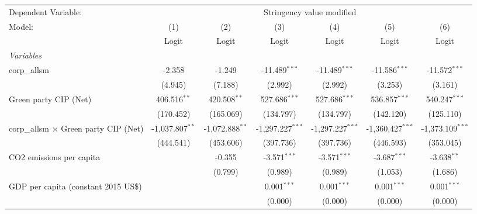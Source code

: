 
\begingroup
\centering
\begin{tabular}{lcccccc}
   \toprule
   Dependent Variable: & \multicolumn{6}{c}{Stringency value modified}\\
   Model:                                       & (1)               & (2)               & (3)                & (4)                & (5)                & (6)\\  
                                                &  Logit            & Logit             & Logit              & Logit              & Logit              & Logit\\  
   \midrule
   \emph{Variables}\\
   corp\_allsm                                  & -2.358            & -1.249            & -11.489$^{***}$    & -11.489$^{***}$    & -11.586$^{***}$    & -11.572$^{***}$\\   
                                                & (4.945)           & (7.188)           & (2.992)            & (2.992)            & (3.253)            & (3.161)\\   
   Green party CIP (Net)                        & 406.516$^{**}$    & 420.508$^{**}$    & 527.686$^{***}$    & 527.686$^{***}$    & 536.857$^{***}$    & 540.247$^{***}$\\   
                                                & (170.452)         & (165.069)         & (134.797)          & (134.797)          & (142.120)          & (125.110)\\   
   corp\_allsm $\times$ Green party CIP (Net)   & -1,037.807$^{**}$ & -1,072.888$^{**}$ & -1,297.227$^{***}$ & -1,297.227$^{***}$ & -1,360.427$^{***}$ & -1,373.109$^{***}$\\   
                                                & (444.541)         & (453.606)         & (397.736)          & (397.736)          & (446.593)          & (353.045)\\   
   CO2 emissions per capita                     &                   & -0.355            & -3.571$^{***}$     & -3.571$^{***}$     & -3.687$^{***}$     & -3.638$^{**}$\\   
                                                &                   & (0.799)           & (0.989)            & (0.989)            & (1.053)            & (1.686)\\   
   GDP per capita (constant 2015 US\$)          &                   &                   & 0.001$^{***}$      & 0.001$^{***}$      & 0.001$^{***}$      & 0.001$^{***}$\\   
                                                &                   &                   & (0.000)            & (0.000)            & (0.000)            & (0.000)\\   

\end{tabular}
